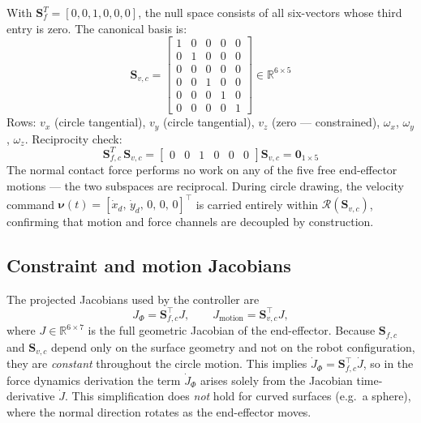 \documentclass[
	german,%
	accentcolor=9c,%
	ruledheaders=section,%
	class=report,%
	thesis={type=bachelor},%
	fontsize=11pt,%
	parskip=half-,%
	custommargins=true,%
	marginpar=false,%
]{tudapub}
\begin{document}
\begin{tcolorbox}[
    colback=gray!8, colframe=gray!45,
    title={Example~5 — Motion selection matrix $\mathbf{S}_v$ and
           reciprocity \eqref{eq:reciprocity}},
    fonttitle=\bfseries\small, left=6pt, right=6pt, top=4pt, bottom=4pt]
\small
With $\mathbf{S}_f^T = [0,0,1,0,0,0]$, the null space consists of all
six-vectors whose third entry is zero. The canonical basis is:
\begin{equation*}
    \mathbf{S}_{v,c} =
    \begin{bmatrix}
        1 & 0 & 0 & 0 & 0 \\
        0 & 1 & 0 & 0 & 0 \\
        0 & 0 & 0 & 0 & 0 \\
        0 & 0 & 1 & 0 & 0 \\
        0 & 0 & 0 & 1 & 0 \\
        0 & 0 & 0 & 0 & 1
    \end{bmatrix}
    \in \mathbb{R}^{6\times 5}
\end{equation*}
Rows: $v_x$ (circle tangential), $v_y$ (circle tangential), $v_z$
(zero — constrained), $\omega_x$, $\omega_y$, $\omega_z$.
Reciprocity check:
\begin{equation*}
    \mathbf{S}_{f,c}^T\,\mathbf{S}_{v,c}
    = \begin{bmatrix}0&0&1&0&0&0\end{bmatrix}
      \mathbf{S}_{v,c}
    = \mathbf{0}_{1\times 5}
\end{equation*}
The normal contact force performs no work on any of the five free
end-effector motions — the two subspaces are reciprocal.
During circle drawing, the velocity command $\boldsymbol{\nu}(t) =
[\dot{x}_d,\,\dot{y}_d,\,0,\,0,\,0]^\top$ is carried entirely within
$\mathcal{R}(\mathbf{S}_{v,c})$, confirming that motion and force
channels are decoupled by construction.
\end{tcolorbox}

\subsection*{Constraint and motion Jacobians}

The projected Jacobians used by the controller are
\begin{equation}
    J_\Phi = \mathbf{S}_{f,c}^\top J, \qquad
    J_\text{motion} = \mathbf{S}_{v,c}^\top J,
    \label{eq:proj_jacobians}
\end{equation}
where $J \in \mathbb{R}^{6 \times 7}$ is the full geometric Jacobian of
the end-effector.
Because $\mathbf{S}_{f,c}$ and $\mathbf{S}_{v,c}$ depend only on the surface
geometry and not on the robot configuration, they are \emph{constant}
throughout the circle motion.
This implies $\dot{J}_\Phi = \mathbf{S}_{f,c}^\top \dot{J}$, so in the
force dynamics derivation the term $\dot{J}_\Phi$ arises solely from the
Jacobian time-derivative $\dot{J}$.
This simplification does \emph{not} hold for curved surfaces (e.g.\ a sphere),
where the normal direction rotates as the end-effector moves.
\end{document}

